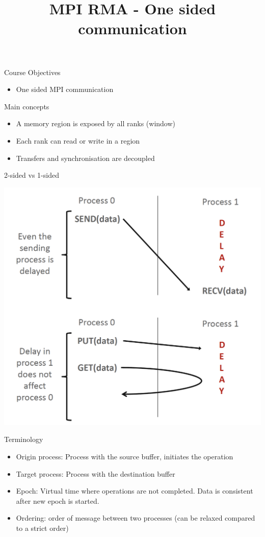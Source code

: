 \documentclass[aspectratio=43]{beamer}
\title{MPI RMA -  One sided communication}
\begin{document}
\cscstitle

\begin{frame}{Course Objectives}
\begin{itemize}
\item One sided MPI communication
\end{itemize}
\end{frame}


\begin{frame}[fragile]{Main concepts}
\begin{itemize}
    \item A memory region is exposed by all ranks (window)
    \item Each rank can read or write in a region
    \item Transfers and synchronisation are decoupled
\end{itemize}
\end{frame}

\begin{frame}[fragile]{2-sided vs 1-sided}
    \begin{center}
        \includegraphics[scale=0.3]{07.MPI_RMA/1sidedvs2sided.png}
    \end{center}
\end{frame}

\begin{frame}[fragile]{Terminology}
\begin{itemize}
\item Origin process: Process with the source buffer, initiates the operation
\item Target process: Process with the destination buffer
\item Epoch: Virtual time where operations are not completed. Data is consistent after new epoch is started.
\item Ordering: order of message between two processes (can be relaxed compared to a strict order)
\end{itemize}

\end{frame}
\end{document}
